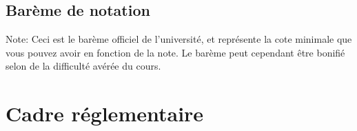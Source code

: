 \documentclass[12pt,undergraduate]{uqtrplandecours}
\begin{document}

\subsection*{Barème de notation}

\printgrades

Note: Ceci est le barème officiel de l'université,
  et représente la cote minimale que vous pouvez avoir en fonction de la note.
Le barème peut cependant être bonifié selon de la difficulté avérée du cours.


\section{Cadre réglementaire}
\cadrereglementaire


\clearpage
\signatures


%
\end{document}
